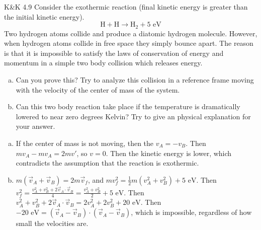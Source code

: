 \documentclass{esg8012pset}
\begin{document}
\begin{problem}{K\&K 4.9}
  Consider the exothermic reaction (final kinetic energy is greater than the initial kinetic energy).
  $$\text{H} + \text{H} \to \text{H}_2 + 5\text{ eV}$$
  Two hydrogen atoms collide and produce a diatomic hydrogen molecule. However, when hydrogen atoms collide in free space they simply bounce apart. The reason is that it is impossible to satisfy the laws of conservation of energy and momentum in a simple two body collision which releases energy.
  \begin{enumerate}[(a)]
  \item Can you prove this? Try to analyze this collision in a reference frame moving with the velocity of the center of mass of the system.
    \item Can this two body reaction take place if the temperature is dramatically lowered to near zero degrees Kelvin? Try to give an physical explanation for your answer.
  \end{enumerate}
\end{problem}
\begin{solution}
  \begin{enumerate}[(a)]
  \item If the center of mass is not moving, then the $v_A = -v_B$.  Then $m v_A - m v_A = 2 m v'$, so $v = 0$.  Then the kinetic energy is lower, which contradicts the assumption that the reaction is exothermic.
    \item $m(\vec v_A + \vec v_B) = 2 m \vec v_f$, and $mv_f^2 = \frac{1}{2}m(v_A^2 + v_B^2) + 5\text{ eV}$.  Then $v_f^2 = \frac{v_A^2 + v_B^2 + 2\vec v_A \cdot \vec v_B}{4} = \frac{v_A^2 + v_B^2}{2} + 5\text{ eV}$.  Then $v_A^2 + v_B^2 + 2\vec v_A \cdot \vec v_B = 2v_A^2 + 2v_B^2 + 20\text{ eV}$.  Then $-20\text{ eV} = (\vec v_A - \vec v_B)\cdot(\vec v_A - \vec v_B)$, which is impossible, regardless of how small the velocities are.
  \end{enumerate}
\end{solution}
\end{document}
